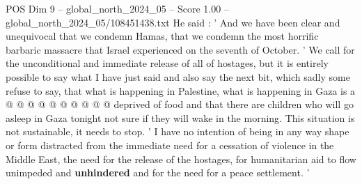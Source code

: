\begin{textsample}{POS Dim 9 – global\_north\_2024\_05 – Score 1.00 – global\_north\_2024\_05/108451438.txt}
He said : ' And we have been clear and unequivocal that we condemn Hamas, that we condemn the most horrific barbaric massacre that Israel experienced on the seventh of October. ' We call for the unconditional and immediate release of all of hostages, but it is entirely possible to say what I have just said and also say the next bit, which sadly some refuse to say, that what is happening in Palestine, what is happening in Gaza is a @ @ @ @ @ @ @ @ @ @ deprived of food and that there are children who will go asleep in Gaza tonight not sure if they will wake in the morning.
This situation is not sustainable, it needs to stop. ' I have no intention of being in any way shape or form distracted from the immediate need for a cessation of violence in the Middle East, the need for the release of the hostages, for humanitarian aid to flow unimpeded and \textbf{unhindered} and for the need for a peace settlement. '

\end{textsample}
